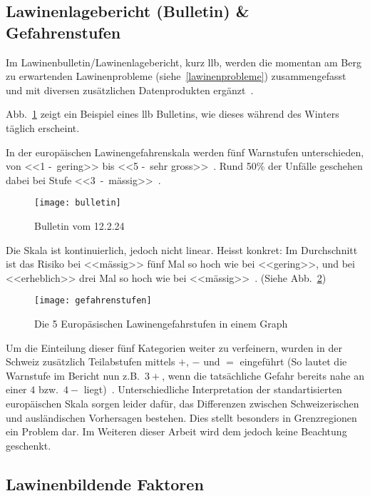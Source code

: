 \subsection{Lawinenlagebericht (Bulletin) \& Gefahrenstufen}

Im Lawinenbulletin/Lawinenlagebericht, kurz \gls{llb}, werden die momentan am Berg zu erwartenden Lawinenprobleme (siehe~\ref{lawinenprobleme}) zusammengefasst und mit diversen zusätzlichen Datenprodukten ergänzt~\cite{lawinengefskala}.

Abb.\ \ref{fig:bulletin} zeigt ein Beispiel eines \gls{llb} Bulletins, wie dieses während des Winters täglich erscheint.

In der europäischen Lawinengefahrenskala werden fünf Warnstufen unterschieden, von <<1 -~gering>> bis <<5 -~sehr gross>>~\cite{harveyrhynerschweizerlawinenkunde}\cite{lawinengefskala}.
Rund 50\% der Unfälle geschehen dabei bei Stufe <<3~-~mässig>>~\cite{achtunglawine}.

\begin{figure}[H]
  \centering
  \texttt{[image: bulletin]}
  \caption{Bulletin vom 12.2.24~\cite{slfarchiv}}\label{fig:bulletin}
\end{figure}

Die Skala ist kontinuierlich, jedoch nicht linear. Heisst konkret: 
Im Durchschnitt ist das Risiko bei <<mässig>> fünf Mal so hoch wie bei <<gering>>, und bei <<erheblich>> drei Mal so hoch wie bei <<mässig>>~\cite{sacbergspwinter}. (Siehe Abb.\ \ref{fig:llbdanger})

\begin{figure}[H]
  \centering
  \texttt{[image: gefahrenstufen]}
  \caption{Die 5 Europäsischen Lawinengefahrstufen in einem Graph}\label{fig:llbdanger}
\end{figure}
Um die Einteilung dieser fünf Kategorien weiter zu verfeinern, wurden in der Schweiz zusätzlich Teilabstufen mittels $+$, $-$ und $=$ eingeführt (So lautet die Warnstufe im Bericht nun z.B.\ $3+$, wenn die tatsächliche Gefahr bereits nahe an einer $4$ bzw.\ $4-$ liegt)~\cite{sacbergspwinter}.
Unterschiedliche Interpretation der standartisierten europäischen Skala sorgen leider dafür, das Differenzen zwischen Schweizerischen und ausländischen Vorhersagen bestehen. Dies stellt besonders in Grenzregionen ein Problem dar. Im Weiteren dieser Arbeit wird dem jedoch keine Beachtung geschenkt.

\pagebreak
\subsection{Lawinenbildende Faktoren}

